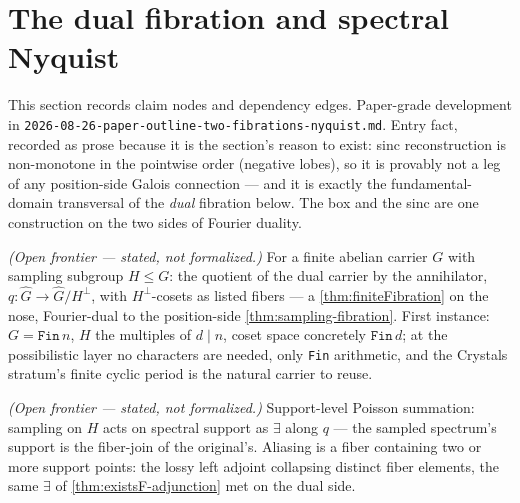 \section{The dual fibration and spectral Nyquist}

This section records claim nodes and dependency edges. Paper-grade development in
\texttt{2026-08-26-paper-outline-two-fibrations-nyquist.md}. Entry fact, recorded as
prose because it is the section's reason to exist: sinc reconstruction is non-monotone
in the pointwise order (negative lobes), so it is provably not a leg of any position-side
Galois connection --- and it is exactly the fundamental-domain transversal of the
\emph{dual} fibration below. The box and the sinc are one construction on the two sides
of Fourier duality.

\begin{proposition}\label{thm:dual-fibration}\notready{}
\emph{(Open frontier --- stated, not formalized.)} For a finite abelian carrier $G$ with
sampling subgroup $H \le G$: the quotient of the dual carrier by the annihilator,
$q : \hat{G} \to \hat{G}/H^{\perp}$, with $H^{\perp}$-cosets as listed fibers --- a
\cref{thm:finiteFibration} on the nose, Fourier-dual to the position-side
\cref{thm:sampling-fibration}. First instance: $G = \texttt{Fin}\,n$,
$H$ the multiples of $d \mid n$, coset space concretely $\texttt{Fin}\,d$; at the
possibilistic layer no characters are needed, only \texttt{Fin} arithmetic, and the
Crystals stratum's finite cyclic period is the natural carrier to reuse.
\end{proposition}

\begin{theorem}\label{thm:aliasing-fiber-collision}\notready{}
\emph{(Open frontier --- stated, not formalized.)} Support-level Poisson summation:
sampling on $H$ acts on spectral support as $\exists$ along $q$ --- the sampled
spectrum's support is the fiber-join of the original's. Aliasing is a fiber containing
two or more support points: the lossy left adjoint collapsing distinct fiber elements,
the same $\exists$ of \cref{thm:existsF-adjunction} met on the dual side.
\end{theorem}

